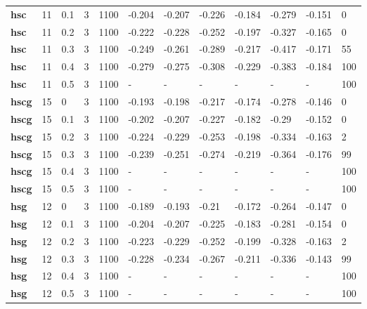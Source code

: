 \begin{longtable}[h]{|p{0.8cm}|p{1.5cm}|p{1cm}|p{1cm}|p{1cm}|p{1cm}|p{1cm}|p{1cm}|p{1cm}|p{1cm}|p{1cm}|p{1.5cm}|}
           \\
  \textbf{hsc } &  11         & 0.1 & 3 & 1100 & -0.204 & -0.207 & -0.226 & -0.184 & -0.279 & -0.151 &   0
           \\
  \textbf{hsc } &  11         & 0.2 & 3 & 1100 & -0.222 & -0.228 & -0.252 & -0.197 & -0.327 & -0.165 &   0
           \\
  \textbf{hsc } &  11         & 0.3 & 3 & 1100 & -0.249 & -0.261 & -0.289 & -0.217 & -0.417 & -0.171 &  55
           \\
  \textbf{hsc } &  11         & 0.4 & 3 & 1100 & -0.279 & -0.275 & -0.308 & -0.229 & -0.383 & -0.184 & 100
           \\
  \textbf{hsc } &  11         & 0.5 & 3 & 1100 & - & - & - & - & - & - & 100
           \\
  \textbf{hscg} &  15         &   0 & 3 & 1100 & -0.193 & -0.198 & -0.217 & -0.174 & -0.278 & -0.146 &   0
           \\
  \textbf{hscg} &  15         & 0.1 & 3 & 1100 & -0.202 & -0.207 & -0.227 & -0.182 &  -0.29 & -0.152 &   0
           \\
  \textbf{hscg} &  15         & 0.2 & 3 & 1100 & -0.224 & -0.229 & -0.253 & -0.198 & -0.334 & -0.163 &   2
           \\
  \textbf{hscg} &  15         & 0.3 & 3 & 1100 & -0.239 & -0.251 & -0.274 & -0.219 & -0.364 & -0.176 &  99
           \\
  \textbf{hscg} &  15         & 0.4 & 3 & 1100 & - & - & - & - & - & - & 100
           \\
  \textbf{hscg} &  15         & 0.5 & 3 & 1100 & - & - & - & - & - & - & 100
           \\
  \textbf{hsg } &  12         &   0 & 3 & 1100 & -0.189 & -0.193 &  -0.21 & -0.172 & -0.264 & -0.147 &   0
           \\
  \textbf{hsg } &  12         & 0.1 & 3 & 1100 & -0.204 & -0.207 & -0.225 & -0.183 & -0.281 & -0.154 &   0
           \\
  \textbf{hsg } &  12         & 0.2 & 3 & 1100 & -0.223 & -0.229 & -0.252 & -0.199 & -0.328 & -0.163 &   2
           \\
  \textbf{hsg } &  12         & 0.3 & 3 & 1100 & -0.228 & -0.234 & -0.267 & -0.211 & -0.336 & -0.143 &  99
           \\
  \textbf{hsg } &  12         & 0.4 & 3 & 1100 & - & - & - & - & - & - & 100
           \\
  \textbf{hsg } &  12         & 0.5 & 3 & 1100 & - & - & - & - & - & - & 100
           \\
 \end{longtable}
